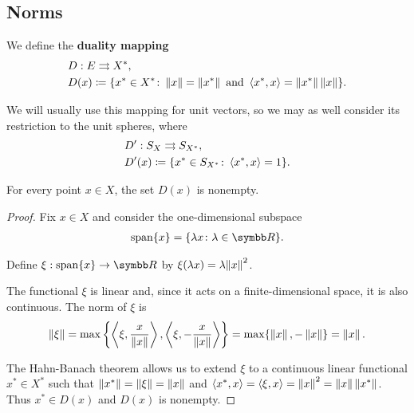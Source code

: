 \subsection{Norms}\label{subsec:norms}

\begin{definition}\cite[Example 2.26]{Phelps1993}
  We define the \textbf{duality mapping}
  \begin{align*}
    &D: E \rightrightarrows X^*, \\
    &D(x) \coloneqq \{ x^* \in X^* \colon \left\Vert x \right\Vert = \left\Vert x^* \right\Vert \text{ and } \left\langle x^*, x \right\rangle = \left\Vert x^* \right\Vert \left\Vert x \right\Vert \}.
  \end{align*}
\end{definition}

\begin{remark}
  We will usually use this mapping for unit vectors, so we may as well consider its restriction to the unit spheres, where
  \begin{align*}
    &D': S_X \rightrightarrows S_{X^*}, \\
    &D'(x) \coloneqq \{ x^* \in S_{X^*} \colon \left\langle x^*, x \right\rangle = 1 \}.
  \end{align*}
\end{remark}

\begin{lemma}\label{thm:nonempty_banach_duality_mapping}
  For every point \( x \in X \), the set \( D(x) \) is nonempty.
\end{lemma}
\begin{proof}
  Fix \( x \in X \) and consider the one-dimensional subspace
  \begin{align*}
    \Span \{ x \}
    =
    \{ \lambda x \colon \lambda \in \R \}.
  \end{align*}

  Define \( \xi: \Span \{ x \} \to \R \) by \( \xi(\lambda x) = \lambda {\left\Vert x \right\Vert}^2 \).

  The functional \( \xi \) is linear and, since it acts on a finite-dimensional space, it is also continuous. The norm of \( \xi \) is
  \begin{equation*}
    \left\Vert \xi \right\Vert = \max \left\{ \left\langle \xi, \frac x {\left\Vert x \right\Vert} \right\rangle, \left\langle \xi, -\frac x {\left\Vert x \right\Vert} \right\rangle \right\} = \max \{ \left\Vert x \right\Vert, -\left\Vert x \right\Vert \} = \left\Vert x \right\Vert.
  \end{equation*}

  The Hahn-Banach theorem allows us to extend \( \xi \) to a continuous linear functional \( x^* \in X^* \) such that \( \left\Vert x^* \right\Vert = \left\Vert \xi \right\Vert = \left\Vert x \right\Vert \) and \( \left\langle x^*, x \right\rangle = \left\langle \xi, x \right\rangle = \left\Vert x \right\Vert^2 = \left\Vert x \right\Vert \left\Vert x^* \right\Vert \). Thus \( x^* \in D(x) \) and \( D(x) \) is nonempty.
\end{proof}

